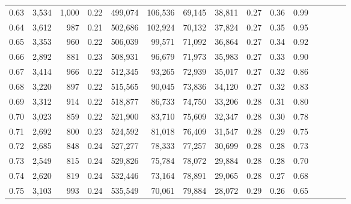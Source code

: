 \begin{tabular}{rrrcrrrrrrrrrrr}
0.63 &   3,534 &   1,000 &                                       0.22 &  499,074 &  106,536 &   69,145 &   38,811 &  0.27 &  0.36 &                         0.99 \\
0.64 &   3,612 &     987 &                                       0.21 &  502,686 &  102,924 &   70,132 &   37,824 &  0.27 &  0.35 &                         0.95 \\
0.65 &   3,353 &     960 &                                       0.22 &  506,039 &   99,571 &   71,092 &   36,864 &  0.27 &  0.34 &                         0.92 \\
0.66 &   2,892 &     881 &                                       0.23 &  508,931 &   96,679 &   71,973 &   35,983 &  0.27 &  0.33 &                         0.90 \\
0.67 &   3,414 &     966 &                                       0.22 &  512,345 &   93,265 &   72,939 &   35,017 &  0.27 &  0.32 &                         0.86 \\
0.68 &   3,220 &     897 &                                       0.22 &  515,565 &   90,045 &   73,836 &   34,120 &  0.27 &  0.32 &                         0.83 \\
0.69 &   3,312 &     914 &                                       0.22 &  518,877 &   86,733 &   74,750 &   33,206 &  0.28 &  0.31 &                         0.80 \\
0.70 &   3,023 &     859 &                                       0.22 &  521,900 &   83,710 &   75,609 &   32,347 &  0.28 &  0.30 &                         0.78 \\
0.71 &   2,692 &     800 &                                       0.23 &  524,592 &   81,018 &   76,409 &   31,547 &  0.28 &  0.29 &                         0.75 \\
0.72 &   2,685 &     848 &                                       0.24 &  527,277 &   78,333 &   77,257 &   30,699 &  0.28 &  0.28 &                         0.73 \\
0.73 &   2,549 &     815 &                                       0.24 &  529,826 &   75,784 &   78,072 &   29,884 &  0.28 &  0.28 &                         0.70 \\
0.74 &   2,620 &     819 &                                       0.24 &  532,446 &   73,164 &   78,891 &   29,065 &  0.28 &  0.27 &                         0.68 \\
0.75 &   3,103 &     993 &                                       0.24 &  535,549 &   70,061 &   79,884 &   28,072 &  0.29 &  0.26 &                         0.65 \\

\end{tabular}
